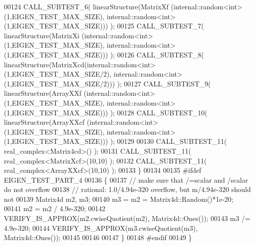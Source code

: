 \begin{DoxyCode}
00124     CALL\_SUBTEST\_6( linearStructure(MatrixXf (internal::random<int>(1,EIGEN\_TEST\_MAX\_SIZE), 
      internal::random<int>(1,EIGEN\_TEST\_MAX\_SIZE))) );
00125     CALL\_SUBTEST\_7( linearStructure(MatrixXi (internal::random<int>(1,EIGEN\_TEST\_MAX\_SIZE), 
      internal::random<int>(1,EIGEN\_TEST\_MAX\_SIZE))) );
00126     CALL\_SUBTEST\_8( linearStructure(MatrixXcd(internal::random<int>(1,EIGEN\_TEST\_MAX\_SIZE/2), 
      internal::random<int>(1,EIGEN\_TEST\_MAX\_SIZE/2))) );
00127     CALL\_SUBTEST\_9( linearStructure(ArrayXXf (internal::random<int>(1,EIGEN\_TEST\_MAX\_SIZE), 
      internal::random<int>(1,EIGEN\_TEST\_MAX\_SIZE))) );
00128     CALL\_SUBTEST\_10( linearStructure(ArrayXXcf (internal::random<int>(1,EIGEN\_TEST\_MAX\_SIZE), 
      internal::random<int>(1,EIGEN\_TEST\_MAX\_SIZE))) );
00129     
00130     CALL\_SUBTEST\_11( real\_complex<Matrix4cd>() );
00131     CALL\_SUBTEST\_11( real\_complex<MatrixXcf>(10,10) );
00132     CALL\_SUBTEST\_11( real\_complex<ArrayXXcf>(10,10) );
00133   \}
00134   
00135 \textcolor{preprocessor}{#ifdef EIGEN\_TEST\_PART\_4}
00136   \{
00137     \textcolor{comment}{// make sure that /=scalar and /scalar do not overflow}
00138     \textcolor{comment}{// rational: 1.0/4.94e-320 overflow, but m/4.94e-320 should not}
00139     Matrix4d m2, m3;
00140     m3 = m2 =  Matrix4d::Random()*1e-20;
00141     m2 = m2 / 4.9e-320;
00142     VERIFY\_IS\_APPROX(m2.cwiseQuotient(m2), Matrix4d::Ones());
00143     m3 /= 4.9e-320;
00144     VERIFY\_IS\_APPROX(m3.cwiseQuotient(m3), Matrix4d::Ones());
00145     
00146     
00147   \}
00148 \textcolor{preprocessor}{#endif}
00149 \}
\end{DoxyCode}
